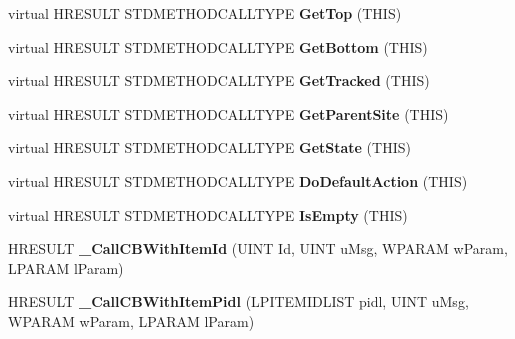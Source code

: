 \begin{DoxyCompactItemize}
\mbox{\label{class_c_menu_band_a3a96763e3694d49eec8750e64093c1b7}} 
virtual H\+R\+E\+S\+U\+LT S\+T\+D\+M\+E\+T\+H\+O\+D\+C\+A\+L\+L\+T\+Y\+PE {\bfseries Get\+Top} (T\+H\+IS)
\item 
\mbox{\label{class_c_menu_band_a827a5ee10c398022e2b0385881f4e084}} 
virtual H\+R\+E\+S\+U\+LT S\+T\+D\+M\+E\+T\+H\+O\+D\+C\+A\+L\+L\+T\+Y\+PE {\bfseries Get\+Bottom} (T\+H\+IS)
\item 
\mbox{\label{class_c_menu_band_af1557ec604521ea7b868774485ab6434}} 
virtual H\+R\+E\+S\+U\+LT S\+T\+D\+M\+E\+T\+H\+O\+D\+C\+A\+L\+L\+T\+Y\+PE {\bfseries Get\+Tracked} (T\+H\+IS)
\item 
\mbox{\label{class_c_menu_band_a34e2aa8d2e04bc82fdf6c07c886d4c46}} 
virtual H\+R\+E\+S\+U\+LT S\+T\+D\+M\+E\+T\+H\+O\+D\+C\+A\+L\+L\+T\+Y\+PE {\bfseries Get\+Parent\+Site} (T\+H\+IS)
\item 
\mbox{\label{class_c_menu_band_a419d058106eb1741abc8eb4a556032f7}} 
virtual H\+R\+E\+S\+U\+LT S\+T\+D\+M\+E\+T\+H\+O\+D\+C\+A\+L\+L\+T\+Y\+PE {\bfseries Get\+State} (T\+H\+IS)
\item 
\mbox{\label{class_c_menu_band_af3836bfa2a4954e6c34cac5f338f6eb7}} 
virtual H\+R\+E\+S\+U\+LT S\+T\+D\+M\+E\+T\+H\+O\+D\+C\+A\+L\+L\+T\+Y\+PE {\bfseries Do\+Default\+Action} (T\+H\+IS)
\item 
\mbox{\label{class_c_menu_band_a87fd66a004a7a7995a87c037ac3407ff}} 
virtual H\+R\+E\+S\+U\+LT S\+T\+D\+M\+E\+T\+H\+O\+D\+C\+A\+L\+L\+T\+Y\+PE {\bfseries Is\+Empty} (T\+H\+IS)
\item 
\mbox{\label{class_c_menu_band_a97d1ee031706a1fed56eb77814a9fb6a}} 
H\+R\+E\+S\+U\+LT {\bfseries \+\_\+\+Call\+C\+B\+With\+Item\+Id} (U\+I\+NT Id, U\+I\+NT u\+Msg, W\+P\+A\+R\+AM w\+Param, L\+P\+A\+R\+AM l\+Param)
\item 
\mbox{\label{class_c_menu_band_a01b37cf3641f7c75292b877e116f6606}} 
H\+R\+E\+S\+U\+LT {\bfseries \+\_\+\+Call\+C\+B\+With\+Item\+Pidl} (L\+P\+I\+T\+E\+M\+I\+D\+L\+I\+ST pidl, U\+I\+NT u\+Msg, W\+P\+A\+R\+AM w\+Param, L\+P\+A\+R\+AM l\+Param)

\end{DoxyCompactItemize}
